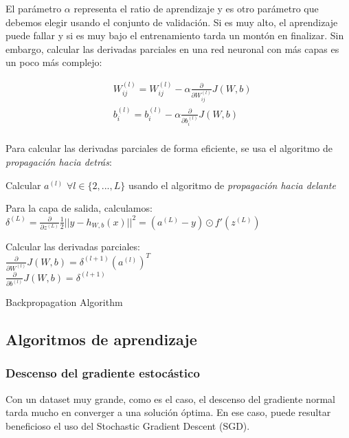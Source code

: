 El parámetro $\alpha$ representa el ratio de aprendizaje y es otro parámetro que debemos elegir usando el conjunto de validación. Si es muy alto, el aprendizaje puede fallar y si es muy bajo el entrenamiento tarda un montón en finalizar. Sin embargo, calcular las derivadas parciales en una red neuronal con más capas es un poco más complejo:

\begin{align*}
	&W^{(l)}_{ij} = W^{(l)}_{ij} - \alpha \frac{\partial}{\partial W^{(l)}_{ij}} J(W,b)\\
	&b^{(l)}_i = b^{(l)}_i - \alpha \frac{\partial}{\partial b^{(l)}_i} J(W,b)\\
\end{align*}

Para calcular las derivadas parciales de forma eficiente, se usa el algoritmo de \textit{propagación hacia detrás}:\\

\begin{algorithm}[H]
	\SetAlgoLined
	
	Calcular $a^{(l)}$ $\forall l \in \{2, ..., L\}$ usando el algoritmo de \textit{propagación hacia delante}
	
	Para la capa de salida, calculamos: $\delta^{(L)} = \frac{\partial}{\partial z^{(L)}} \frac{1}{2} || y - h_{W,b}(x) ||^2 = (a^{(L)}- y) \odot f'(z^{(L)})$
	
	
	Calcular las derivadas parciales:\\
	\nonl $\frac{\partial}{\partial W^{(l)}} J(W,b) = \delta^{(l+1)}(a^{(l)})^T$\\
	\nonl $\frac{\partial}{\partial b^{(l)}} J(W,b) = \delta^{(l+1)}$
	
	\caption{Backpropagation Algorithm}
\end{algorithm}

\subsection{Algoritmos de aprendizaje}

\subsubsection{Descenso del gradiente estocástico}

Con un dataset muy grande, como es el caso, el descenso del gradiente normal tarda mucho en converger a una solución óptima. En ese caso, puede resultar beneficioso el uso del Stochastic Gradient Descent (SGD).\newline

